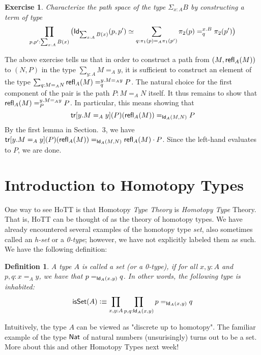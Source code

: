 \documentclass[12pt]{article}
\newcommand{\tr}{\mathsf{tr}}
\newtheorem*{exercise}{Exercise}
\newtheorem*{definition}{Definition}
\begin{document}
\begin{exercise} Characterize the path space of the type $\Sigma_{x:A} B$ by constructing a term of type
\small {\[ \prod_{p,p':\sum_{x:A}B(x)} \big( \mathsf{Id}_{\sum_{x:A}B(x)}(p,p')\simeq\sum_{q:\pi_1(p)=_A\pi_1(p')}\pi_2(p) =^{x.B}_q \pi_2(p') \big) \]}
\end{exercise}

The above exercise tells us that in order to construct a path from $(M,\mathsf{refl}_{A}(M))$ to $(N,P)$ in the type $\sum_{y:A}M=_A y$, it is sufficient to construct an element of the type
$\sum_{q:M=_A N}\mathsf{refl}_{A}(M) =^{y.M=_A y}_q P$. The natural choice for the first component of the pair is the path $P : M=_A N$ itself. It thus remains to show that $\mathsf{refl}_{A}(M) =^{y.M=_A y}_P P$. In particular, this means showing that \[ \tr[y.M=_A y](P)(\refl{A}(M)) =_{\Id{A}(M,N)} P \]
By the first lemma in Section.~3, we have $\tr[y.M=_A y](P)(\refl{A}(M)) =_{\Id{A}(M,N)} \refl{A}(M) \cdot P$. Since the left-hand evaluates to $P$, we are done.

\section{Introduction to Homotopy Types}
One way to see HoTT is that Homotopy \emph{Type Theory} is \emph{Homotopy Type} Theory.
That is, HoTT can be thought of as the theory of homotopy types. We have already
encountered several examples of the homotopy type \emph{set}, also sometimes called an
\emph{h-set} or a \emph{0-type}; however, we have not explicitly labeled them as such. We have the
following definition:

\begin{definition} A type $A$ is called a \emph{set} (or a \emph{0-type}), if for all $x, y : A$ and $p, q : x =_A y$,
we have that $p =_{\mathsf{Id}_{A}(x,y)} q$. In other words, the following type is inhabited:
  \[ \mathsf{isSet}(A) \vcentcolon\equiv \prod_{x,y:A} \prod_{p,q:\mathsf{Id}_{A}(x,y)} p =_{\mathsf{Id}_{A}(x,y)} q \]
\end{definition}
Intuitively, the type $A$ can be viewed as "discrete up to homotopy". The familiar example of the type $\mathsf{Nat}$ of natural numbers (unsurisingly) turns out to be a set.
More about this and other Homotopy Types next week!
\end{document}

